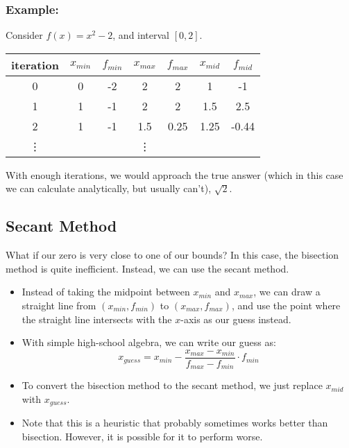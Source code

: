 \documentclass[10pt]{article}
\begin{document}
\subsubsection*{Example:}
Consider $f(x) = x^2 - 2$, and interval $[0, 2]$.
\begin{center}
    \begin{tabular}{|c|cccccc|}
        \hline
        iteration & $x_{min}$ & $f_{min}$ & $x_{max}$ & $f_{max}$ & $x_{mid}$ & $f_{mid}$ \\\hline
        0 & 0 & -2 & 2 & 2 & 1 & -1 \\
        1 & 1 & -1 & 2 & 2 & 1.5 & 2.5 \\
        2 & 1 & -1 & 1.5 & 0.25 & 1.25 & -0.44\\
        \vdots & & & \vdots & & & \\
        \hline
    \end{tabular}
\end{center}
With enough iterations, we would approach the true answer (which in this case we can calculate analytically, but usually can't), $\sqrt{2}$.

\subsection*{Secant Method}
What if our zero is very close to one of our bounds?  In this case, the bisection method is quite inefficient.  Instead, we can use the secant method.
\begin{itemize}
	\item Instead of taking the midpoint between $x_{min}$ and $x_{max}$, we can draw a straight line from $(x_{min}, f_{min})$ to $(x_{max}, f_{max})$, and use the point where the straight line intersects with the $x$-axis as our guess instead.
	\item With simple high-school algebra, we can write our guess as:
	\[x_{guess} = x_{min} - \frac{x_{max} - x_{min}}{f_{max} - f_{min}} \cdot f_{min}\]
    \item To convert the bisection method to the secant method, we just replace $x_{mid}$ with $x_{guess}$.
    \item Note that this is a heuristic that probably sometimes works better than bisection.  However, it is possible for it to perform worse.
\end{itemize}
\end{document}
